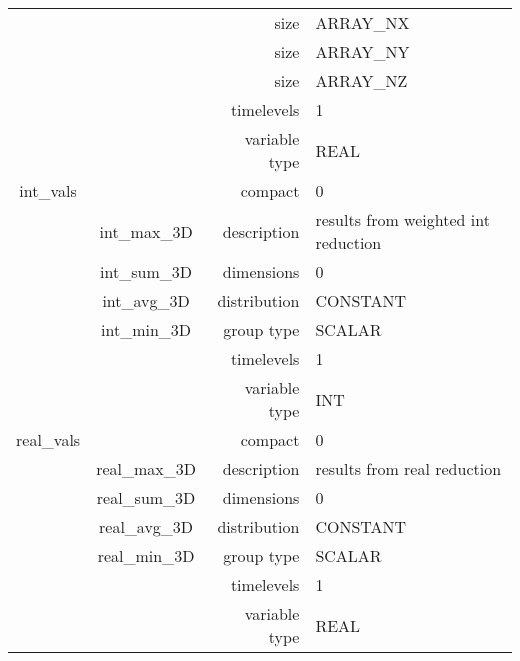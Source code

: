 \begin{tabular*}{150mm}{|c|c@{\extracolsep{\fill}}|rl|}
 &  & size & ARRAY\_NX \\ 
& ~ & size & ARRAY\_NY \\ 
 &  & size & ARRAY\_NZ \\ 
 &  & timelevels & 1 \\ 
 &  & variable type & REAL \\ 
\hline 
int\_vals &  & compact & 0 \\ 
 & int\_max\_3D & description & results from weighted int reduction \\ 
 & int\_sum\_3D & dimensions & 0 \\ 
 & int\_avg\_3D & distribution & CONSTANT \\ 
 & int\_min\_3D & group type & SCALAR \\ 
 &  & timelevels & 1 \\ 
 &  & variable type & INT \\ 
\hline 
real\_vals &  & compact & 0 \\ 
 & real\_max\_3D & description & results from real reduction \\ 
 & real\_sum\_3D & dimensions & 0 \\ 
 & real\_avg\_3D & distribution & CONSTANT \\ 
 & real\_min\_3D & group type & SCALAR \\ 
 &  & timelevels & 1 \\ 
 &  & variable type & REAL \\ 
\hline 
\end{tabular*} 



\vspace{5mm}
\vspace{5mm}

